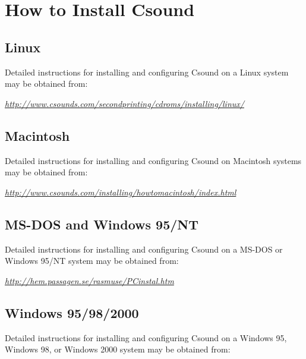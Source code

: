 \begin{comment}
\documentclass[10pt]{article}
\usepackage{fullpage, graphicx, url}
\setlength{\parskip}{1ex}
\setlength{\parindent}{0ex}
\title{How to Install Csound}



\begin{tabular}{ccc}
The Alternative Csound Reference Manual & & \\
Previous &Introduction &Next

\end{tabular}

\end{comment}
\section{How to Install Csound}
\subsection*{Linux}


  Detailed instructions for installing and configuring Csound on a Linux system may be obtained from: 


  \emph{\url{http://www.csounds.com/secondprinting/cdroms/installing/linux/}}
 
\subsection*{Macintosh}


  Detailed instructions for installing and configuring Csound on Macintosh systems may be obtained from: 


  \emph{\url{http://www.csounds.com/installing/howtomacintosh/index.html}}
 
\subsection*{MS-DOS and Windows 95/NT}


  Detailed instructions for installing and configuring Csound on a MS-DOS or Windows 95/NT system may be obtained from: 


  \emph{\url{http://hem.passagen.se/rasmuse/PCinstal.htm}}
 
\subsection*{Windows 95/98/2000}


  Detailed instructions for installing and configuring Csound on a Windows 95, Windows 98, or Windows 2000 system may be obtained from: 


